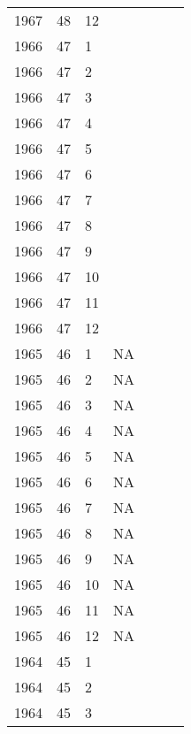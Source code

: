 \begin{longtable}{ |l|l|l|l|p{2.7cm}|l|p{2cm}| }
 1967 & 48 &    12 &         &                &  & \\
 1966 & 47 &     1 &         &                &  & \\
 1966 & 47 &     2 &         &                &  & \\
 1966 & 47 &     3 &         &                &  & \\
 1966 & 47 &     4 &         &                &  & \\
 1966 & 47 &     5 &         &                &  & \\
 1966 & 47 &     6 &         &                &  & \\
 1966 & 47 &     7 &         &                &  & \\
 1966 & 47 &     8 &         &                &  & \\
 1966 & 47 &     9 &         &                &  & \\
 1966 & 47 &    10 &         &                &  & \\
 1966 & 47 &    11 &         &                &  & \\
 1966 & 47 &    12 &         &                &  & \\
 1965 & 46 &     1 &      NA &                &  & \\
 1965 & 46 &     2 &      NA &                &  & \\
 1965 & 46 &     3 &      NA &                &  & \\
 1965 & 46 &     4 &      NA &                &  & \\
 1965 & 46 &     5 &      NA &                &  & \\
 1965 & 46 &     6 &      NA &                &  & \\
 1965 & 46 &     7 &      NA &                &  & \\
 1965 & 46 &     8 &      NA &                &  & \\
 1965 & 46 &     9 &      NA &                &  & \\
 1965 & 46 &    10 &      NA &                &  & \\
 1965 & 46 &    11 &      NA &                &  & \\
 1965 & 46 &    12 &      NA &                &  & \\
 1964 & 45 &     1 &         &                &  & \\
 1964 & 45 &     2 &         &                &  & \\
 1964 & 45 &     3 &         &                &  & \\

\end{longtable}
